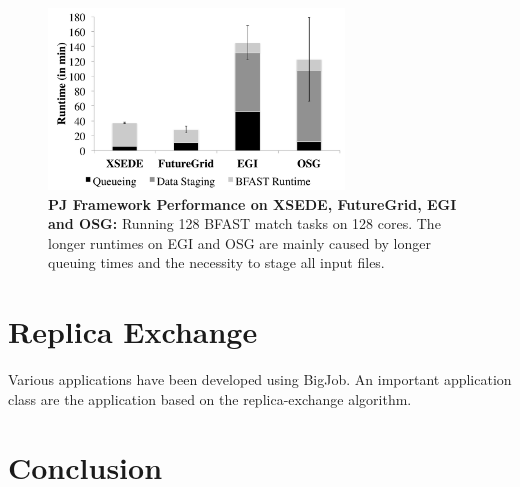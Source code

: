 \documentclass[]{paper}
\begin{document}
\begin{figure}[t]
\centering
\includegraphics[width=0.7\textwidth]{figures/128-bfast-egi-fg-xsede-osg.pdf}
\caption{\textbf{PJ Framework Performance on XSEDE, FutureGrid, EGI and 
  OSG:} Running 128 BFAST match tasks on 128 cores. The longer runtimes on EGI 
  and OSG are mainly caused by  longer queuing times and the necessity to      
  stage all input files.}
  \label{fig:perf_perf-bfast-bj}
\end{figure}


\section{Replica Exchange}

Various applications have been developed using BigJob. An important 
application class are the application based on the replica-exchange algorithm.







\section{Conclusion}




\end{document}
